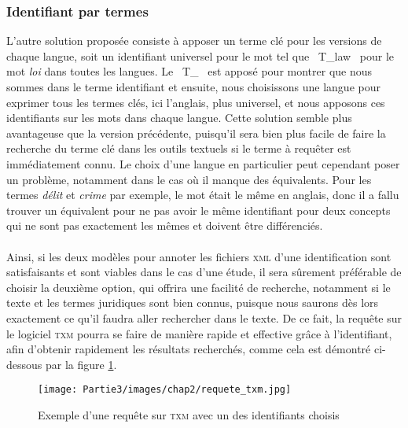 \subsubsection{Identifiant par termes}
L'autre solution proposée consiste à apposer un terme clé pour les versions de chaque langue, soit un identifiant universel pour le mot tel que \og~T\_law~\fg{} pour le mot \textit{loi} dans toutes les langues. Le \og~T\_~\fg{} est apposé pour montrer que nous sommes dans le terme identifiant et ensuite, nous choisissons une langue pour exprimer tous les termes clés, ici l'anglais, plus universel, et nous apposons ces identifiants sur les mots dans chaque langue. Cette solution semble plus avantageuse que la version précédente, puisqu'il sera bien plus facile de faire la recherche du terme clé dans les outils textuels si le terme à requêter est immédiatement connu. Le choix d'une langue en particulier peut cependant poser un problème, notamment dans le cas où il manque des équivalents. Pour les termes \textit{délit} et \textit{crime} par exemple, le mot était le même en anglais, donc il a fallu trouver un équivalent pour ne pas avoir le même identifiant pour deux concepts qui ne sont pas exactement les mêmes et doivent être différenciés.

\paragraph{}Ainsi, si les deux modèles pour annoter les fichiers \textsc{xml} d'une identification sont satisfaisants et sont viables dans le cas d'une étude, il sera sûrement préférable de choisir la deuxième option, qui offrira une facilité de recherche, notamment si le texte et les termes juridiques sont bien connus, puisque nous saurons dès lors exactement ce qu'il faudra aller rechercher dans le texte. De ce fait, la requête sur le logiciel \textsc{txm} pourra se faire de manière rapide et effective grâce à l'identifiant, afin d'obtenir rapidement les résultats recherchés, comme cela est démontré ci-dessous par la figure \ref{fig:requete_txm}.
\begin{figure}[H]
    \centering
    \caption{Exemple d'une requête sur \textsc{txm} avec un des identifiants choisis}
    \texttt{[image: Partie3/images/chap2/requete\_txm.jpg]}
    \label{fig:requete_txm}
\end{figure}

